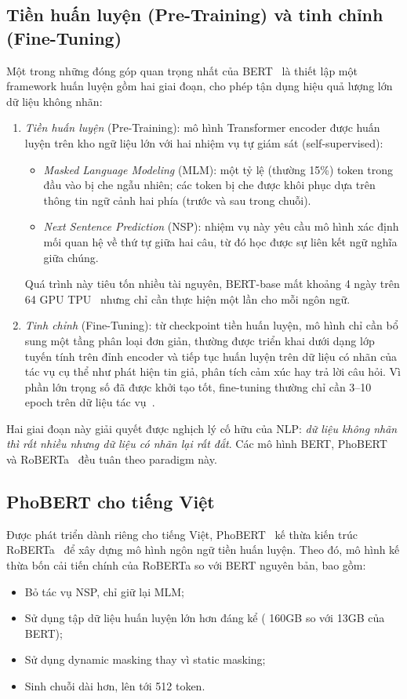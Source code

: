 \subsection{Tiền huấn luyện (Pre-Training) và tinh chỉnh (Fine-Tuning)}

Một trong những đóng góp quan trọng nhất của BERT~\cite{devlin2019bert} là thiết lập một framework huấn luyện gồm hai giai đoạn, cho phép tận dụng hiệu quả lượng lớn dữ liệu không nhãn:

\begin{enumerate}[leftmargin=2.5em]
  \item \textit{Tiền huấn luyện} (Pre-Training): mô hình Transformer encoder được huấn luyện trên kho ngữ liệu lớn với hai nhiệm vụ tự giám sát (self-supervised):
  \begin{itemize}
    \item \textit{Masked Language Modeling} (MLM): một tỷ lệ (thường 15\%) token trong đầu vào bị che ngẫu nhiên; các token bị che được khôi phục dựa trên thông tin ngữ cảnh hai phía (trước và sau trong chuỗi).
    \item \textit{Next Sentence Prediction} (NSP): nhiệm vụ này yêu cầu mô hình xác định mối quan hệ về thứ tự giữa hai câu, từ đó học được sự liên kết ngữ nghĩa giữa chúng.
  \end{itemize}
  Quá trình này tiêu tốn nhiều tài nguyên, BERT-base mất khoảng 4 ngày trên 64 GPU TPU~\cite{devlin2019bert}  nhưng chỉ cần thực hiện một lần cho mỗi ngôn ngữ.
  \item \textit{Tinh chỉnh} (Fine-Tuning): từ checkpoint tiền huấn luyện, mô hình chỉ cần bổ sung một tầng phân loại đơn giản, thường được triển khai dưới dạng lớp tuyến tính trên đỉnh encoder và tiếp tục huấn luyện trên dữ liệu có nhãn của tác vụ cụ thể như phát hiện tin giả, phân tích cảm xúc hay trả lời câu hỏi. Vì phần lớn trọng số đã được khởi tạo tốt, fine-tuning thường chỉ cần 3--10 epoch trên dữ liệu tác vụ~\cite{rajpurkar2016squad}.
\end{enumerate}

Hai giai đoạn này giải quyết được nghịch lý cố hữu của NLP: \textit{dữ liệu không nhãn thì rất nhiều nhưng dữ liệu có nhãn lại rất đắt}. Các mô hình BERT, PhoBERT và RoBERTa~\cite{liu2019roberta} đều tuân theo paradigm này.

\subsection{PhoBERT cho tiếng Việt}
Được phát triển dành riêng cho tiếng Việt, PhoBERT~\cite{phobert2020} kế thừa kiến trúc RoBERTa~\cite{liu2019roberta} để xây dựng mô hình ngôn ngữ tiền huấn luyện. Theo đó, mô hình kế thừa bốn cải tiến chính của RoBERTa so với BERT nguyên bản, bao gồm:
\begin{itemize}[leftmargin=2em]
  \item Bỏ tác vụ NSP, chỉ giữ lại MLM;
  \item Sử dụng tập dữ liệu huấn luyện lớn hơn đáng kể ( 160GB so với 13GB của BERT);
  \item Sử dụng dynamic masking thay vì static masking;
  \item Sinh chuỗi dài hơn, lên tới 512 token.
\end{itemize}


